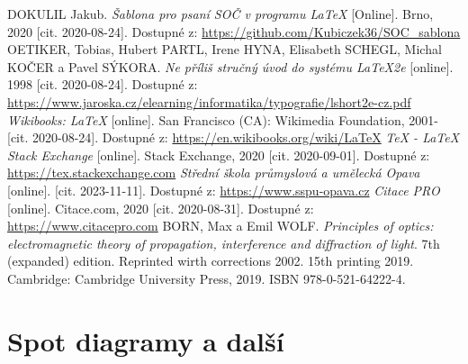 \documentclass[12pt, a4paper,
twoside,        %
openright
]{report}
\begin{document}
	\begin{thebibliography}{99}
		 DOKULIL Jakub. \textit{Šablona pro psaní SOČ v programu \LaTeX} [Online]. Brno, 2020 [cit. 2020-08-24]. Dostupné z: \url{https://github.com/Kubiczek36/SOC_sablona}
		OETIKER, Tobias, Hubert PARTL, Irene HYNA, Elisabeth SCHEGL, Michal KOČER a Pavel SÝKORA. \textit{Ne příliš stručný úvod do systému LaTeX2e} [online]. 1998 [cit. 2020-08-24]. Dostupné z: \url{https://www.jaroska.cz/elearning/informatika/typografie/lshort2e-cz.pdf}
		\textit{Wikibooks: LaTeX} [online]. San Francisco (CA): Wikimedia Foundation, 2001- [cit. 2020-08-24]. Dostupné z: \url{https://en.wikibooks.org/wiki/LaTeX}
		 \textit{TeX - LaTeX Stack Exchange} [online]. Stack Exchange, 2020 [cit. 2020-09-01]. Dostupné z: \url{https://tex.stackexchange.com}
		 \textit{Střední škola průmyslová a umělecká Opava} [online]. [cit. 2023-11-11]. Dostupné z: \url{https://www.sspu-opava.cz}
		\textit{Citace PRO} [online]. Citace.com, 2020 [cit. 2020-08-31]. Dostupné z: \url{https://www.citacepro.com}
		 BORN, Max a Emil WOLF. \textit{Principles of optics: electromagnetic theory of propagation, interference and diffraction of light}. 7th (expanded) edition. Reprinted wirth corrections 2002. 15th printing 2019. Cambridge: Cambridge University Press, 2019. ISBN 978-0-521-64222-4.
	\end{thebibliography}
	
	\listoffigures
	
	\listoftables
	
	\appendix %
	
	[\vspace{-22pt}] %
	
	
	\chapter{%
		Spot diagramy a další }
	
	
\end{document}
